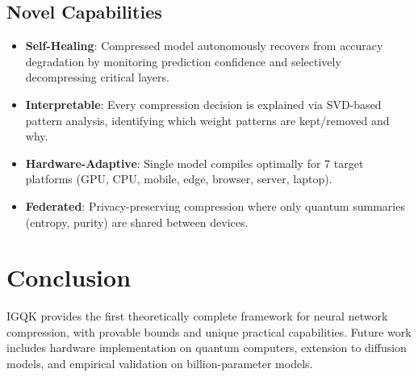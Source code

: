 \documentclass[11pt,a4paper]{article}
\begin{document}
\subsection{Novel Capabilities}

\begin{itemize}
    \item \textbf{Self-Healing}: Compressed model autonomously recovers from accuracy degradation by monitoring prediction confidence and selectively decompressing critical layers.
    \item \textbf{Interpretable}: Every compression decision is explained via SVD-based pattern analysis, identifying which weight patterns are kept/removed and why.
    \item \textbf{Hardware-Adaptive}: Single model compiles optimally for 7 target platforms (GPU, CPU, mobile, edge, browser, server, laptop).
    \item \textbf{Federated}: Privacy-preserving compression where only quantum summaries (entropy, purity) are shared between devices.
\end{itemize}

\section{Conclusion}

IGQK provides the first theoretically complete framework for neural network compression, with provable bounds and unique practical capabilities. Future work includes hardware implementation on quantum computers, extension to diffusion models, and empirical validation on billion-parameter models.



\end{document}
